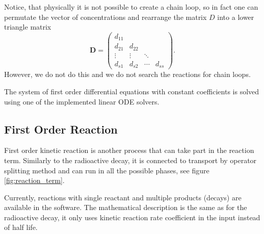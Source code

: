 Notice, that physically it is not possible to create a chain loop, so in fact one can permutate the vector of 
concentrations and rearrange the matrix $D$ into a lower triangle matrix
\[
\mathbf{D} = \begin{pmatrix} d_{11} &  &  &  \\ 
                  d_{21} & d_{22} & &  \\
                  \vdots &\vdots& \ddots &  \\
                  d_{s1} &d_{s2}& \cdots & d_{ss} \end{pmatrix}.
\]
However, we do not do this and we do not search the reactions for chain loops.

The system of first order differential equations with constant coefficients is solved using one of the
implemented linear ODE solvers.


\subsection{First Order Reaction}
\label{sec:first_order_reaction}
First order kinetic reaction is another process that can take part in the reaction term. Similarly to the
radioactive decay, it is connected to transport by operator splitting method and can run in all the possible
phases, see figure \ref{fig:reaction_term}.

Currently, reactions with single reactant and multiple products (decays) are available in the software.
The mathematical description is the same as for the radioactive decay, it only uses kinetic reaction rate
coefficient  in the input instead of half life.







